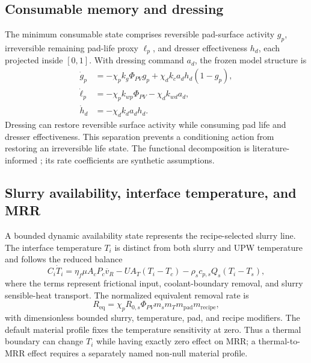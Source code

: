 \documentclass[10pt,twocolumn]{article}
\begin{document}
\subsection{Consumable memory and dressing}

The minimum consumable state comprises reversible pad-surface activity $g_p$,
irreversible remaining pad-life proxy $\ell_p$, and dresser effectiveness
$h_d$, each projected inside $[0,1]$. With dressing command $a_d$, the frozen
model structure is
\begin{align}
 \dot g_p &=-\chi_pk_g\Phi_{PV}g_p
 +\chi_dk_ca_dh_d(1-g_p), \label{eq:pad-activity}\\
 \dot\ell_p &=-\chi_pk_{wp}\Phi_{PV}-\chi_dk_{wd}a_d,\label{eq:pad-life}\\
 \dot h_d &=-\chi_dk_da_dh_d.\label{eq:dresser}
\end{align}
Dressing can restore reversible surface activity while consuming pad life and
dresser effectiveness. This separation prevents a conditioning action from
restoring an irreversible life state. The functional decomposition is
literature-informed \cite{borucki2002,borucki2004,chang2007,sun2010}; its rate
coefficients are synthetic assumptions.

\subsection{Slurry availability, interface temperature, and MRR}

A bounded dynamic availability state represents the recipe-selected slurry
line. The interface temperature $T_i$ is distinct from both slurry and UPW
temperature and follows the reduced balance
\begin{equation}
 C_i\dot T_i=\eta_f\mu A_cP_c\overline v_R
 -UA_T(T_i-T_c)-\rho_sc_{p,s}Q_s(T_i-T_s),
 \label{eq:thermal-balance}
\end{equation}
where the terms represent frictional input, coolant-boundary removal, and
slurry sensible-heat transport. The normalized equivalent removal rate is
\begin{equation}
 R_{\mathrm{eq}}=\chi_p R_{0,s}\Phi_{PV}
 m_s m_T m_{\mathrm{pad}}m_{\mathrm{recipe}},
 \label{eq:mrr}
\end{equation}
with dimensionless bounded slurry, temperature, pad, and recipe modifiers.
The default material profile fixes the temperature sensitivity at zero. Thus a
thermal boundary can change $T_i$ while having exactly zero effect on MRR; a
thermal-to-MRR effect requires a separately named non-null material profile.
\end{document}
